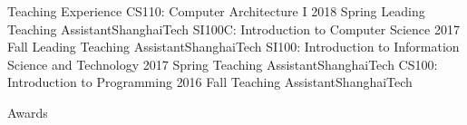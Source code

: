 \documentclass{resume} %
\begin{document}

\begin{rSection}{Teaching Experience}
    \rItem
      {CS110: Computer Architecture I }{ 2018 Spring }
      {Leading Teaching Assistant}{ShanghaiTech}
    \rItem
      {SI100C: Introduction to Computer Science }{ 2017 Fall }
      {Leading Teaching Assistant}{ShanghaiTech}
    \rItem
      {SI100: Introduction to Information Science and Technology }{ 2017 Spring }
      {Teaching Assistant}{ShanghaiTech}
    \rItem
      {CS100: Introduction to Programming }{ 2016 Fall }
      {Teaching Assistant}{ShanghaiTech}
\end{rSection}
\vspace{-1.75em}

\begin{rSection}{Awards}
\end{rSection}
\end{document}
